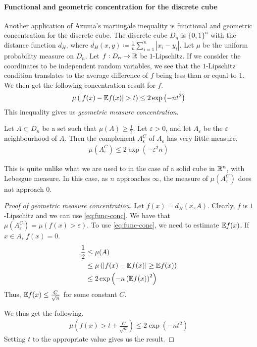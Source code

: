 \documentclass[11pt]{article}
\begin{document}
\paragraph{Functional and geometric concentration for the discrete cube}

Another application of Azuma's martingale inequality is functional and geometric concentration for the discrete cube.
The discrete cube $D_n$ is $\{0,1\}^n$ with the distance function $d_H$, where $d_H(x, y) \coloneqq \frac{1}{n} \sum_{i=1}^n |x_i - y_i|$.
Let $\mu$ be the uniform probability measure on $D_n$.
Let $f: D_n \to \mathbb{R}$ be $1$-Lipschitz.
If we consider the coordinates to be independent random variables, we see that the $1$-Lipschitz condition translates to the average difference of $f$ being less than or equal to $1$.
We then get the following concentration result for $f$.
\begin{align}
  \label{eq:func-conc}
  \mu\left( \left| f(x) - \mathbb{E} f(x) \right| > t \right) \leq 2 \exp \left( - nt^2 \right)
\end{align}
This inequality gives us \emph{geometric measure concentration}.
\begin{theorem}
  Let $A \subset D_n$ be a set such that $\mu(A) \geq \frac{1}{2}$.
  Let $\varepsilon > 0$, and let $A_\varepsilon$ be the $\varepsilon$ neighbourhood of $A$.
  Then the complement $A_\varepsilon^C$ of $A_\varepsilon$ has very little measure.
  \begin{align*}
    \mu(A_\varepsilon^C) \leq 2 \exp \left( - \varepsilon^2 n \right)
  \end{align*}
\end{theorem}
This is quite unlike what we are used to in the case of a solid cube in $\mathbb{R}^n$, with Lebesgue measure.
In this case, as $n$ approaches $\infty$, the measure of $\mu(A_\varepsilon^C)$ does not approach $0$.
\begin{proof}[Proof of geometric measure concentration]
  Let $f(x) = d_H(x, A)$. Clearly, $f$ is $1$-Lipschitz and we can use \eqref{eq:func-conc}.
  We have that $\mu(A_\varepsilon^C) = \mu(f(x)>\varepsilon)$.
  To use \eqref{eq:func-conc}, we need to estimate $\mathbb{E} f(x)$.
  If $x \in A$, $f(x) = 0$.
  \begin{align*}
    \frac{1}{2} &\leq \mu(A) \\
                &\leq \mu\left( \left| f(x) - \mathbb{E} f(x) \right| \geq \mathbb{E} f(x) \right) \\
    &\leq 2 \exp \left( - n \left( \mathbb{E} f(x) \right)^2 \right)
  \end{align*}
  Thus, $\mathbb{E} f(x) \leq \frac{C}{\sqrt{n}}$ for some constant $C$.

  We thus get the following.
  \begin{align*}
    \mu\left( f(x) > t + \frac{C}{\sqrt{n}} \right) \leq 2 \exp(-nt^2)
  \end{align*}
  Setting $t$ to the appropriate value gives us the result.
\end{proof}
\end{document}
